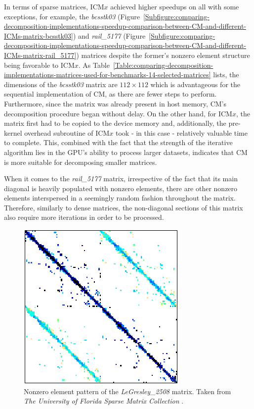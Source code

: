 In terms of sparse matrices, ICM$ x $ achieved higher speedups on all with some exceptions, for example, the \textit{bcsstk03} (Figure~\ref{Subfigure:comparing-decomposition-implementations-speedup-comparison-between-CM-and-different-ICMs-matrix-bcsstk03}) and \textit{rail\_5177} (Figure~\ref{Subfigure:comparing-decomposition-implementations-speedup-comparison-between-CM-and-different-ICMs-matrix-rail_5177}) matrices despite the former's nonzero element structure being favorable to ICM$ x $. As Table~\ref{Table:comparing-decomposition-implementations-matrices-used-for-benchmarks-14-selected-matrices} lists, the dimensions of the \textit{bcsstk03} matrix are $ 112\times 112 $ which is advantageous for the sequential implementation of CM, as there are fewer steps to perform. Furthermore, since the matrix was already present in host memory, CM's decomposition procedure began without delay. On the other hand, for ICM$ x $, the matrix first had to be copied to the device memory and, additionally, the pre-kernel overhead subroutine of ICM$ x $ took - in this case - relatively valuable time to complete. This, combined with the fact that the strength of the iterative algorithm lies in the GPU's ability to process larger datasets, indicates that CM is more suitable for decomposing smaller matrices.

\par When it comes to the \textit{rail\_5177} matrix, irrespective of the fact that its main diagonal is heavily populated with nonzero elements, there are other nonzero elements interspersed in a seemingly random fashion throughout the matrix. Therefore, similarly to dense matrices, the non-diagonal sections of this matrix also require more iterations in order to be processed.

\begin{figure}
	\centering
	\includegraphics[width=.35\textwidth, keepaspectratio, clip]{images/ch3/matrices/legresley_2508.png}
	\caption{Nonzero element pattern of the \textit{LeGresley\_2508} matrix. Taken from \emph{The University of Florida Sparse Matrix Collection} \cite{Davis2011}.}
	\label{Figure:comparing-decomposition-implementations-speedup-comparison-between-CM-and-different-ICMs-matrix-legresley_2508}
\end{figure}

